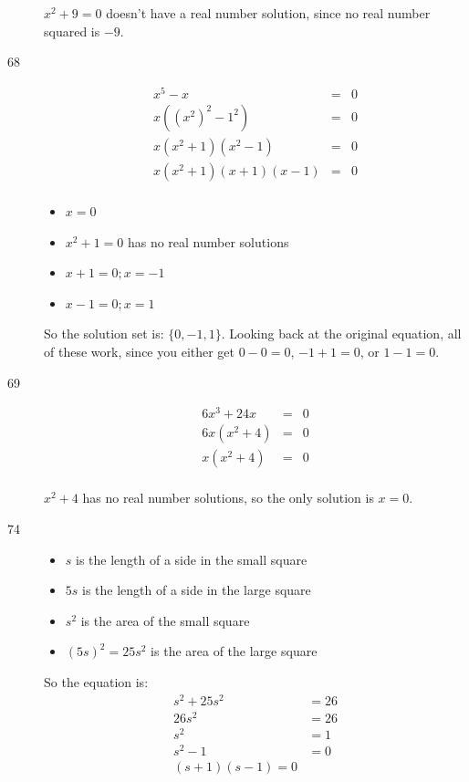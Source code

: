 \documentclass[fleqn,addpoints]{exam}
\begin{document}
\begin{description}
$x^2 + 9 = 0$ doesn't have a real number solution, since no real number squared is $-9$.

\item[68]
\begin{eqnarray*}
  x^5 - x &=& 0 \\
  x((x^2)^2 - 1^2) &=& 0 \\
  x(x^2 + 1)(x^2 - 1) &=& 0 \\
  x(x^2 + 1)(x + 1)(x - 1) &=& 0 \\
\end{eqnarray*}

\begin{itemize}
  \item $x = 0$
  \item $x^2 + 1 = 0$ has no real number solutions
  \item $x + 1 = 0; x = -1$
  \item $x - 1 = 0; x = 1$
\end{itemize}

So the solution set is: $\{0, -1, 1\}$.  Looking back at the original equation, all of these work, since you either 
get $0 - 0 = 0$, $-1 + 1 = 0$, or $1 - 1 = 0$.

\item[69]
\begin{eqnarray*}
  6x^3 + 24x &=& 0 \\
  6x(x^2 + 4) &=& 0 \\
  x(x^2 + 4) &=& 0 \\
\end{eqnarray*}

$x^2 + 4$ has no real number solutions, so the only solution is $x = 0$.

\item[74]
\begin{itemize}
  \item $s$ is the length of a side in the small square
  \item $5s$ is the length of a side in the large square
  \item $s^2$ is the area of the small square
  \item $(5s)^2 = 25s^2$ is the area of the large square
\end{itemize}

So the equation is:
\begin{align*}
  s^2 + 25s^2 &= 26  \\
  26s^2 &= 26  \\
  s^2   &= 1 \\
  s^2 - 1  &= 0 \\
  (s + 1)(s - 1) = 0 \\
\end{align*}


\end{description}
\end{document}

